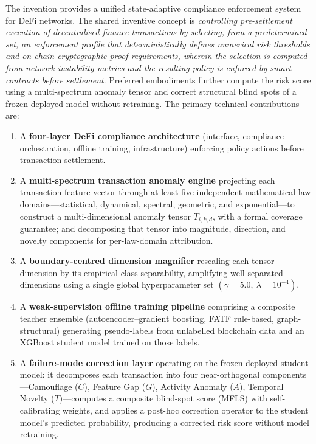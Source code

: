 \documentclass[12pt,a4paper]{article}
\begin{document}
The invention provides a unified state-adaptive compliance enforcement
system for DeFi networks. The shared inventive concept is
\emph{controlling pre-settlement execution of decentralised finance
transactions by selecting, from a predetermined set, an enforcement profile
that deterministically defines numerical risk thresholds and on-chain
cryptographic proof requirements, wherein the selection is computed from
network instability metrics and the resulting policy is enforced by smart
contracts before settlement}. Preferred embodiments further compute the risk
score using a multi-spectrum anomaly tensor and correct structural blind
spots of a frozen deployed model without retraining. The primary technical
contributions are:

\begin{enumerate}[label=(\roman*)]

\item A \textbf{four-layer DeFi compliance architecture} (interface,
compliance orchestration, offline training, infrastructure) enforcing
policy actions before transaction settlement.

\item A \textbf{multi-spectrum transaction anomaly engine} projecting
each transaction feature vector through at least five independent
mathematical law domains---statistical, dynamical, spectral, geometric,
and exponential---to construct a multi-dimensional anomaly tensor
$T_{i,k,d}$, with a formal coverage guarantee; and decomposing that
tensor into magnitude, direction, and novelty components for per-law-domain
attribution.

\item A \textbf{boundary-centred dimension magnifier} rescaling each
tensor dimension by its empirical class-separability, amplifying
well-separated dimensions using a single global hyperparameter set
$(\gamma{=}5.0,\ \lambda{=}10^{-4})$.

\item A \textbf{weak-supervision offline training pipeline} comprising
a composite teacher ensemble (autoencoder--gradient boosting, FATF
rule-based, graph-structural) generating pseudo-labels from unlabelled
blockchain data and an XGBoost student model trained on those labels.

\item A \textbf{failure-mode correction layer} operating on the frozen
deployed student model: it decomposes each transaction into four
near-orthogonal components---Camouflage ($C$), Feature Gap ($G$), Activity
Anomaly ($A$), Temporal Novelty ($T$)---computes a composite blind-spot
score (MFLS) with self-calibrating weights, and applies a post-hoc
correction operator to the student model's predicted probability, producing
a corrected risk score without model retraining.


\end{enumerate}
\end{document}
